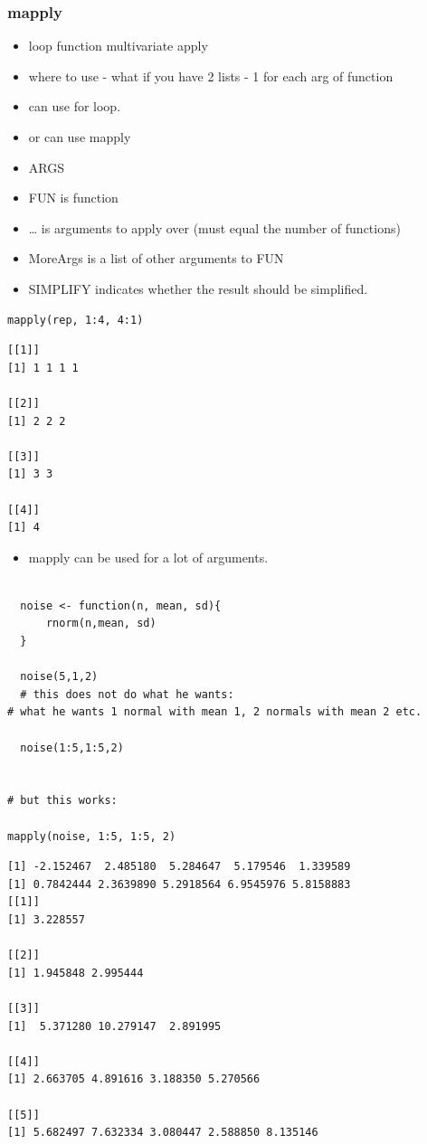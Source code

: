 \documentclass[11pt]{article}
\begin{document}
\subsubsection{mapply}
\label{sec-2-4-7}

\begin{itemize}
\item loop function multivariate apply
\item where to use - what if you have 2 lists - 1 for each arg of function
\item can use for loop.
\item or can use mapply
\item ARGS
\item FUN is function
\item \ldots{} is arguments to apply over (must equal the number of functions)
\item MoreArgs is a list of other arguments to FUN
\item SIMPLIFY indicates whether the result should be simplified.
\end{itemize}


\begin{verbatim}
mapply(rep, 1:4, 4:1)
\end{verbatim}


\begin{verbatim}
[[1]]
[1] 1 1 1 1

[[2]]
[1] 2 2 2

[[3]]
[1] 3 3

[[4]]
[1] 4
\end{verbatim}

\begin{itemize}
\item mapply can be used for a lot of arguments.
\end{itemize}


\begin{verbatim}

  noise <- function(n, mean, sd){
      rnorm(n,mean, sd)
  }

  noise(5,1,2)
  # this does not do what he wants:
# what he wants 1 normal with mean 1, 2 normals with mean 2 etc.

  noise(1:5,1:5,2)


# but this works:

mapply(noise, 1:5, 1:5, 2)
\end{verbatim}


\begin{verbatim}
[1] -2.152467  2.485180  5.284647  5.179546  1.339589
[1] 0.7842444 2.3639890 5.2918564 6.9545976 5.8158883
[[1]]
[1] 3.228557

[[2]]
[1] 1.945848 2.995444

[[3]]
[1]  5.371280 10.279147  2.891995

[[4]]
[1] 2.663705 4.891616 3.188350 5.270566

[[5]]
[1] 5.682497 7.632334 3.080447 2.588850 8.135146
\end{verbatim}
\end{document}
